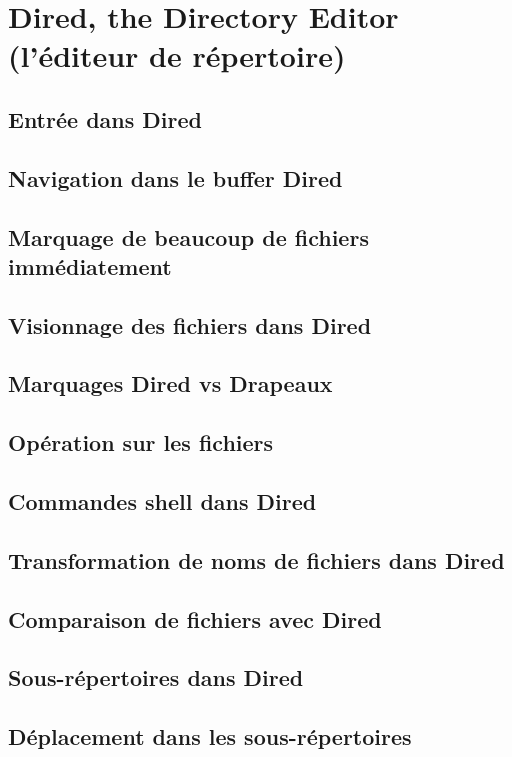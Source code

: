 \chapter{Dired, the Directory Editor (l'éditeur de
  répertoire)}\label{chap27} 
\section{Entrée dans Dired}\label{chap27sec1}
\section{Navigation dans le buffer Dired}\label{chap27sec2}
\section{Marquage de beaucoup de fichiers
  immédiatement}\label{chap27sec3} 
\section{Visionnage des fichiers dans Dired}\label{chap27sec4}
\section{Marquages Dired vs Drapeaux}\label{chap27sec5}
\section{Opération sur les fichiers}\label{chap27sec6}
\section{Commandes shell dans Dired}\label{chap27sec7}
\section{Transformation de noms de fichiers dans Dired}\label{chap27sec8}
\section{Comparaison de fichiers avec Dired}\label{chap27sec9}
\section{Sous-répertoires dans Dired}\label{chap27sec10}
\section{Déplacement dans les sous-répertoires}\label{chap27sec11}
